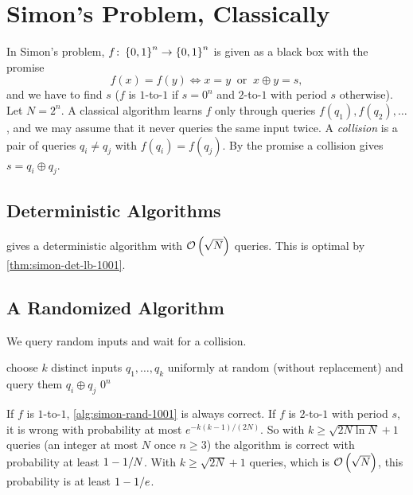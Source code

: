 
\section{Simon's Problem, Classically}

In Simon's problem, $f \colon \left\lbrace0,1\right\rbrace^n \to \left\lbrace0,1\right\rbrace^n$ is given as a black box with the promise
\[f(x) = f(y) \iff x = y \ \text{ or } \ x \oplus y = s,\]
and we have to find $s$ ($f$ is $1$-to-$1$ if $s = 0^n$ and $2$-to-$1$ with period $s$ otherwise).
Let $N = 2^n$. A classical algorithm learns $f$ only through queries $f(q_1), f(q_2), \dots$, and we
may assume that it never queries the same input twice. A \emph{collision} is a pair of queries
$q_i \neq q_j$ with $f(q_i) = f(q_j)$. By the promise a collision gives $s = q_i \oplus q_j$.

\subsection{Deterministic Algorithms}

 gives a deterministic algorithm with $\mathcal{O}\left(\sqrt{N}\right)$ queries. This is
optimal by \cref{thm:simon-det-lb-1001}.

\subsection{A Randomized Algorithm}

We query random inputs and wait for a collision.

\begin{algorithm}[ht]
    \caption{Randomized classical algorithm for Simon's problem}
    \label{alg:simon-rand-1001}
    \begin{algorithmic}[1]
        \State choose $k$ distinct inputs $q_1, \dots, q_k$ uniformly at random (without replacement) and query them
        \State \Return $q_i \oplus q_j$
        \Else
        \State \Return $0^n$
        \EndIf
    \end{algorithmic}
\end{algorithm}

\begin{theorem}\label{thm:simon-rand-ub-1001}
    If $f$ is $1$-to-$1$, \cref{alg:simon-rand-1001} is always correct. If $f$ is $2$-to-$1$ with period
    $s$, it is wrong with probability at most $e^{-k(k-1)/(2N)}$. So with
    $k \geq \sqrt{2N \ln N} + 1$ queries (an integer at most $N$ once $n \geq 3$) the algorithm is correct
    with probability at least $1 - 1/N$. With $k \geq \sqrt{2N} + 1$ queries, which is
    $\mathcal{O}\left(\sqrt{N}\right)$, this probability is at least $1 - 1/e$.
\end{theorem}

